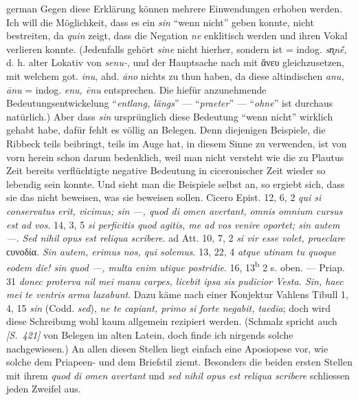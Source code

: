 \begin{otherlanguage*}{german}
Gegen diese Erklärung können mehrere Einwendungen erhoben werden. Ich will die Möglichkeit, dass es ein \emph{sin} “wenn nicht” geben konnte, nicht bestreiten, da \emph{quin} zeigt, dass die Negation \emph{ne} enklitisch werden und ihren Vokal verlieren konnte. (Jedenfalls gehört \emph{sine} nicht hierher, sondern ist = indog. \emph{sn̥nḗ}, d. h. alter Lokativ von\emph{ senu-}, und der Hauptsache nach mit ἄνευ gleichzusetzen, mit welchem got. \emph{inu}, ahd. \emph{āno} nichts zu thun haben, da diese altindischen \emph{anu, ānu} = indog. \emph{enu, ēnu} entsprechen. Die hiefür anzunehmende Bedeutungsentwickelung “\emph{entlang, längs}” — “\emph{praeter}” — “\emph{ohne}” ist durchaus natürlich.) Aber dass \emph{sin} ursprünglich diese Bedeutung “wenn nicht” wirklich gehabt habe, dafür fehlt es völlig an Belegen. Denn diejenigen Beispiele, die Ribbeck teils beibringt, teils im Auge hat, in diesem Sinne zu verwenden, ist von vorn herein schon darum bedenklich, weil man nicht versteht wie die zu Plautus Zeit bereits verflüchtigte negative Bedeutung in ciceronischer Zeit wieder so lebendig sein konnte. Und sieht man die Beispiele selbst an, so ergiebt sich, dass sie das nicht beweisen, was sie beweisen sollen. Cicero Epist. 12, 6, 2 \emph{qui si conservatus erit, vicimus; sin —, quod di omen avertant, omnis omnium cursus est ad vos}. 14, 3, 5 \emph{si perficitis quod agitis, me ad vos venire oportet; sin autem —. Sed nihil opus est reliqua scribere}. ad Att. 10, 7, 2 \emph{si vir esse volet, praeclare} ϲυνοδία. \emph{Sin autem, erimus nos, qui solemus}. 13, 22, 4 \emph{atque utinam tu quoque eodem die! sin quod —, multa enim utique postridie}. 16, 13\textsuperscript{b} 2 s. oben. — Priap. 31 \emph{donec proterva nil mei manu carpes, licebit ipsa sis pudicior Vesta. Sin, haec mei te ventris arma laxabunt}. Dazu käme nach einer Konjektur Vahlens Tibull 1, 4, 15 \emph{sin} (Codd. \emph{sed}), \emph{ne te capiant, primo si forte negabit, taedia}; doch wird diese Schreibung wohl kaum allgemein rezipiert werden. (Schmalz spricht auch \hypertarget{p421}{\emph{[S.~421]}}\label{p421} von Belegen im alten Latein, doch finde ich nirgends solche nachgewiesen.) An allen diesen Stellen liegt einfach eine Aposiopese vor, wie solche dem Priapeen- und dem Briefstil ziemt. Besonders die beiden ersten Stellen mit ihrem \emph{quod di omen avertant} und \emph{sed nihil opus est reliqua scribere} schliessen jeden Zweifel aus.


\end{otherlanguage*}
